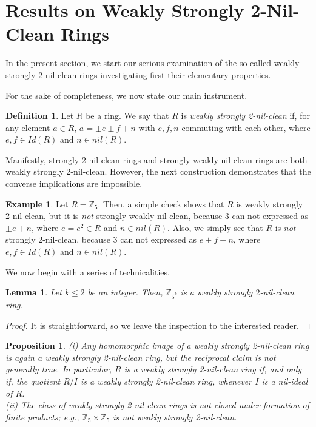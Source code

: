 \documentclass[12pt]{amsart}
\newtheorem{proposition}[theorem]{Proposition}
\newtheorem{lemma}[theorem]{Lemma}
\theoremstyle{definition}
\newtheorem{example}[theorem]{Example}
\newtheorem{definition}[theorem]{Definition}
\begin{document}
\section{Results on Weakly Strongly 2-Nil-Clean Rings}

In the present section, we start our serious examination of the so-called weakly strongly 2-nil-clean rings investigating first their elementary properties.

\medskip

For the sake of completeness, we now state our main instrument.

\begin{definition}\label{2.1} Let $R$ be a ring. We say that $R$ is {\it weakly strongly 2-nil-clean} if, for any element $a\in R$, $a=\pm e\pm f+n$ with $e,f,n$ commuting with each other, where $e,f \in Id(R)$ and $n\in nil(R)$.
\end{definition}

Manifestly, strongly 2-nil-clean rings and strongly weakly nil-clean rings are both weakly strongly 2-nil-clean. However, the next construction demonstrates that the converse implications are impossible.

\begin{example} Let $R=\mathbb{Z}_5$. Then, a simple check shows that $R$ is weakly strongly 2-nil-clean, but it is {\it not} strongly weakly nil-clean, because $3$ can not expressed as $\pm e+n$, where $e=e^2\in R$ and $n\in nil(R)$. Also, we simply see that $R$ is {\it not} strongly 2-nil-clean, because $3$ can not expressed as $e+f+n$, where $e,f\in Id(R)$ and $n\in nil(R)$.
\end{example}

We now begin with a series of technicalities.

\begin{lemma}\label{1} Let $k\leq 2$ be an integer. Then, $\mathbb{Z}_{5^k}$ is a weakly strongly $2$-nil-clean ring.
\end{lemma}

\begin{proof} It is straightforward, so we leave the inspection to the interested reader.
\end{proof}

\begin{proposition}\label{hom} {\rm (i)} Any homomorphic image of a weakly strongly 2-nil-clean ring is again a weakly strongly 2-nil-clean ring, but the reciprocal claim is not generally true. In particular, $R$ is a weakly strongly 2-nil-clean ring if, and only if, the quotient $R/I$ is a weakly strongly 2-nil-clean ring, whenever $I$ is a nil-ideal of $R$.\\\indent
{\rm (ii)} The class of weakly strongly 2-nil-clean rings is not closed under formation of finite products; e.g., $\mathbb{Z}_5 \times \mathbb{Z}_5$ is not weakly strongly 2-nil-clean.
 \end{proposition}
\end{document}
